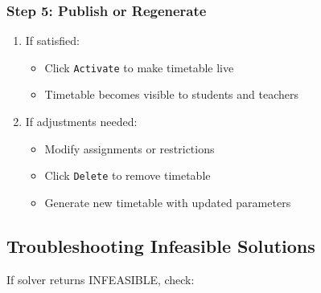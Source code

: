 \documentclass[12pt,a4paper]{article}
\begin{document}
\subsubsection{Step 5: Publish or Regenerate}
\begin{enumerate}
    \item If satisfied:
    \begin{itemize}
        \item Click \texttt{Activate} to make timetable live
        \item Timetable becomes visible to students and teachers
    \end{itemize}
    \item If adjustments needed:
    \begin{itemize}
        \item Modify assignments or restrictions
        \item Click \texttt{Delete} to remove timetable
        \item Generate new timetable with updated parameters
    \end{itemize}
\end{enumerate}

\subsection{Troubleshooting Infeasible Solutions}

If solver returns INFEASIBLE, check:
\end{document}
